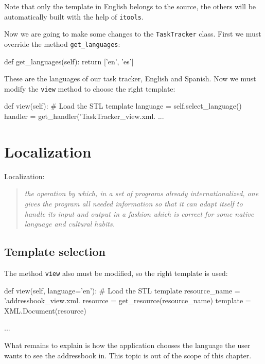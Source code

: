 Note that only the template in English belongs to the source, the others
will be automatically built with the help of {\tt itools}.

Now we are going to make some changes to the {\tt TaskTracker} class.
First we must override the method {\tt get\_languages}:

\begin{code}
    def get_languages(self):
        return ['en', 'es']
\end{code}

These are the languages of our task tracker, English and Spanish. Now we
must modify the {\tt view} method to choose the right template:

\begin{code}
    def view(self):
        # Load the STL template
        language = self.select_language()
        handler = get_handler('TaskTracker_view.xml.%
        ...
\end{code}


\section{Localization}

Localization:

\begin{quote}
  \em
  the operation by which, in a set of programs already internationalized,
  one gives the program all needed information so that it can adapt itself
  to handle its input and output in a fashion which is correct for some
  native language and cultural habits.
\end{quote}





\subsection{Template selection}

The method {\tt view} also must be modified, so the right template is used:

\begin{code}
    def view(self, language='en'):
        # Load the STL template
        resource_name = 'addressbook_view.xml.%
        resource = get_resource(resource_name)
        template = XML.Document(resource)

        ...
\end{code}


What remains to explain is how the application chooses the language the
user wants to see the addressbook in. This topic is out of the scope
of this chapter.

